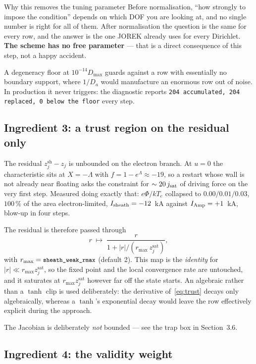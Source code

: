 \documentclass[11pt,a4paper]{article}
\newcommand{\zj}{z_j}
\newcommand{\zjsat}{z^{\mathrm{sat}}_{j}}
\newcommand{\zjsh}{z^{\mathrm{sh}}_{j}}
\newcommand{\code}[1]{\texttt{\small #1}}
\begin{document}
\begin{concept}{Why this removes the tuning parameter}
Before normalisation, ``how strongly to impose the condition'' depends on which DOF you are looking
at, and no single number is right for all of them. After normalisation the question is the same for
every row, and the answer is the one JOREK already uses for every Dirichlet. \textbf{The scheme has no
free parameter} --- that is a direct consequence of this step, not a happy accident.
\end{concept}

A degeneracy floor at $10^{-14}D_{\max}$ guards against a row with essentially no boundary support,
where $1/D_a$ would manufacture an enormous row out of noise. In production it never triggers: the
diagnostic reports \code{204 accumulated, 204 replaced, 0 below the floor} every step.

\subsection{Ingredient 3: a trust region on the residual only}

The residual $\zjsh-\zj$ is unbounded on the electron branch. At $u=0$ the characteristic sits at
$X=-\Lambda$ with $f=1-e^{\Lambda}\approx-19$, so a restart whose wall is not already near floating
asks the constraint for $\sim20\,j_{\rm sat}$ of driving force on the very first step. Measured doing
exactly that: $e\Phi/kT_e$ collapsed to $0.00/0.01/0.03$, $100\,\%$ of the area electron-limited,
$I_{\rm sheath}=-12$~kA against $I_{\rm Amp}=+1$~kA, blow-up in four steps.

The residual is therefore passed through
\begin{equation}
  r \;\longmapsto\; \frac{r}{1 + |r| / (r_{\max}\,\zjsat)},
  \label{eq:trust}
\end{equation}
with $r_{\max}=\code{sheath\_weak\_rmax}$ (default 2). This map is the \emph{identity} for
$|r|\ll r_{\max}\zjsat$, so the fixed point and the local convergence rate are untouched, and it
saturates at $r_{\max}\zjsat$ however far off the state starts. An algebraic rather than a $\tanh$
clip is used deliberately: the derivative of~\eqref{eq:trust} decays only algebraically, whereas a
$\tanh$'s exponential decay would leave the row effectively explicit during the approach.

The Jacobian is deliberately \emph{not} bounded --- see the trap box in Section~3.6.

\subsection{Ingredient 4: the validity weight}
\end{document}
